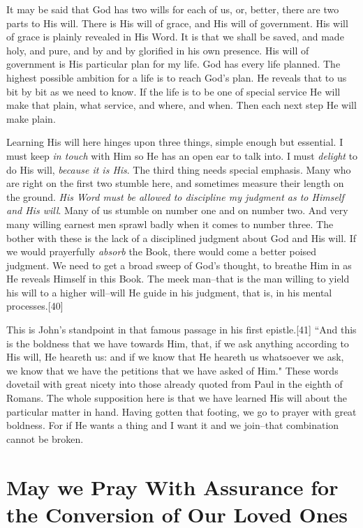 It may be said that God has two wills for each of us, or, better, there
are two parts to His will. There is His will of grace, and His will of
government. His will of grace is plainly revealed in His Word. It is that
we shall be saved, and made holy, and pure, and by and by glorified in his
own presence. His will of government is His particular plan for my life.
God has every life planned. The highest possible ambition for a life is to
reach God's plan. He reveals that to us bit by bit as we need to know. If
the life is to be one of special service He will make that plain, what
service, and where, and when. Then each next step He will make plain.

Learning His will here hinges upon three things, simple enough but
essential. I must keep \textit{in touch} with Him so He has an open ear to talk
into. I must \textit{delight} to do His will, \textit{because it is His}. The third
thing needs special emphasis. Many who are right on the first two stumble
here, and sometimes measure their length on the ground. \textit{His Word must be
allowed to discipline my judgment as to Himself and His will}. Many of us
stumble on number one and on number two. And very many willing earnest men
sprawl badly when it comes to number three. The bother with these is the
lack of a disciplined judgment about God and His will. If we would
prayerfully \textit{absorb} the Book, there would come a better poised judgment.
We need to get a broad sweep of God's thought, to breathe Him in as He
reveals Himself in this Book. The meek man--that is the man willing to
yield his will to a higher will--will He guide in his judgment, that is,
in his mental processes.[40]

This is John's standpoint in that famous passage in his first epistle.[41]
``And this is the boldness that we have towards Him, that, if we ask
anything according to His will, He heareth us: and if we know that He
heareth us whatsoever we ask, we know that we have the petitions that we
have asked of Him." These words dovetail with great nicety into those
already quoted from Paul in the eighth of Romans. The whole supposition
here is that we have learned His will about the particular matter in hand.
Having gotten that footing, we go to prayer with great boldness. For if He
wants a thing and I want it and we join--that combination cannot be
broken.




\chapter{May we Pray With Assurance for the Conversion of Our Loved Ones}



